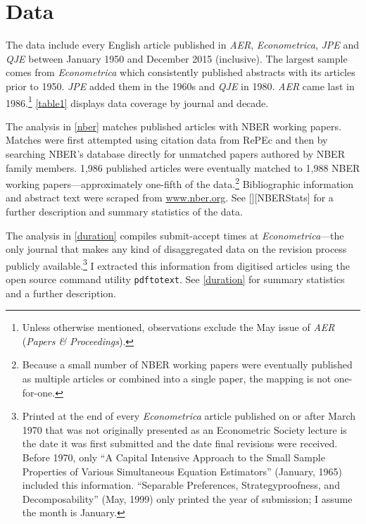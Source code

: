 \section{Data}
\label{abstracts}



The data include every English article published in \emph{AER}, \emph{Econometrica}, \emph{JPE} and \emph{QJE} between January 1950 and December 2015 (inclusive). The largest sample comes from \emph{Econometrica} which consistently published abstracts with its articles prior to 1950. \emph{JPE} added them in the 1960s and \emph{QJE} in 1980. \emph{AER} came last in 1986.\footnote{Unless otherwise mentioned, observations exclude the May issue of \emph{AER} (\emph{Papers \& Proceedings}).} \autoref{table1} displays data coverage by journal and decade.

The analysis in \autoref{nber} matches published articles with NBER working papers. Matches were first attempted using citation data from RePEc and then by searching NBER's database directly for unmatched papers authored by NBER family members. 1,986 published articles were eventually matched to 1,988 NBER working papers---approximately one-fifth of the data.\footnote{Because a small number of NBER working papers were eventually published as multiple articles or combined into a single paper, the mapping is not one-for-one.} Bibliographic information and abstract text were scraped from \href{http://www.nber.org}{www.nber.org}. See [][NBERStats] for a further description and summary statistics of the data.

The analysis in \autoref{duration} compiles submit-accept times at \emph{Econometrica}---the only journal that makes any kind of disaggregated data on the revision process publicly available.\footnote{Printed at the end of every \emph{Econometrica} article published on or after March 1970 that was not originally presented as an Econometric Society lecture is the date it was first submitted and the date final revisions were received. Before 1970, only ``A Capital Intensive Approach to the Small Sample Properties of Various Simultaneous Equation Estimators'' (January, 1965) included this information. ``Separable Preferences, Strategyproofness, and Decomposability'' (May, 1999) only printed the year of submission; I assume the month is January.} I extracted this information from digitised articles using the open source command utility \texttt{pdftotext}. See \autoref{duration} for summary statistics and a further description.

